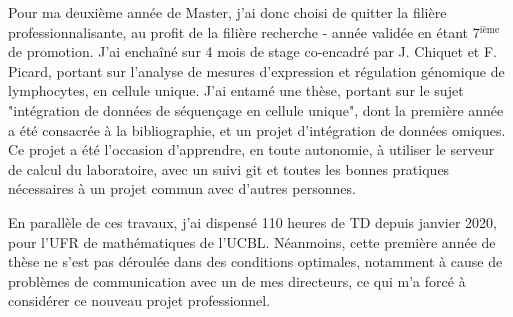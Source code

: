 \documentclass[a4paper,11pt]{article}
\begin{document}
Pour ma deuxième année de Master, j'ai donc choisi de quitter la filière professionnalisante, au profit de la filière recherche - année validée en étant 7$^{\text{ième}}$ de promotion. 
J'ai enchaîné sur 4 mois de stage co-encadré par J. Chiquet et F. Picard, portant sur l'analyse de mesures d'expression et régulation génomique de lymphocytes, en cellule unique. %
%
%
J'ai entamé une thèse, portant sur le sujet "intégration de données de séquençage en cellule unique", dont la première année a été consacrée à la bibliographie, et un projet d'intégration de données omiques.
Ce projet a été l'occasion d'apprendre, en toute autonomie, à utiliser le serveur de calcul du laboratoire, avec un suivi git et toutes les bonnes pratiques nécessaires à un projet commun avec d'autres personnes.
%

En parallèle de ces travaux, j'ai dispensé 110 heures de TD depuis janvier 2020, pour l'UFR de mathématiques de l'UCBL. 
Néanmoins, cette première année de thèse ne s'est pas déroulée dans des conditions optimales, notamment à cause de problèmes de communication avec un de mes directeurs, ce qui m'a forcé à considérer ce nouveau projet professionnel.\\ 
%
\end{document}
